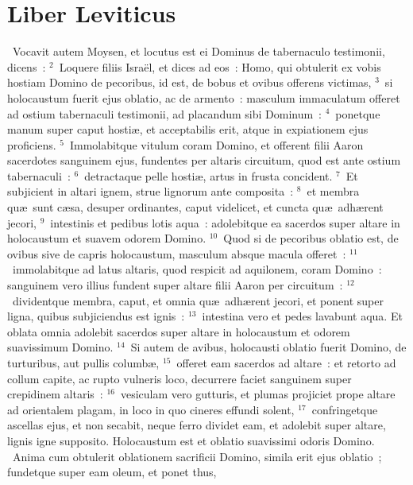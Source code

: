 \clearpage
{\centering \section*{Liber Leviticus}}\thispagestyle{empty}

~Vocavit autem Moysen, et locutus est ei Dominus de tabernaculo testimonii, dicens~:
${}^{2}$~Loquere filiis Isra\"el, et dices ad eos~: Homo, qui obtulerit ex vobis hostiam Domino de pecoribus, id est, de bobus et ovibus offerens victimas,
${}^{3}$~si holocaustum fuerit ejus oblatio, ac de armento~: masculum immaculatum offeret ad ostium tabernaculi testimonii, ad placandum sibi Dominum~:
${}^{4}$~ponetque manum super caput hosti\ae , et acceptabilis erit, atque in expiationem ejus proficiens.
${}^{5}$~Immolabitque vitulum coram Domino, et offerent filii Aaron sacerdotes sanguinem ejus, fundentes per altaris circuitum, quod est ante ostium tabernaculi~:
${}^{6}$~detractaque pelle hosti\ae , artus in frusta concident.
${}^{7}$~Et subjicient in altari ignem, strue lignorum ante composita~:
${}^{8}$~et membra qu\ae\ sunt c\ae sa, desuper ordinantes, caput videlicet, et cuncta qu\ae\ adh\ae rent jecori,
${}^{9}$~intestinis et pedibus lotis aqua~: adolebitque ea sacerdos super altare in holocaustum et suavem odorem Domino.
${}^{10}$~Quod si de pecoribus oblatio est, de ovibus sive de capris holocaustum, masculum absque macula offeret~:
${}^{11}$~immolabitque ad latus altaris, quod respicit ad aquilonem, coram Domino~: sanguinem vero illius fundent super altare filii Aaron per circuitum~:
${}^{12}$~dividentque membra, caput, et omnia qu\ae\ adh\ae rent jecori, et ponent super ligna, quibus subjiciendus est ignis~:
${}^{13}$~intestina vero et pedes lavabunt aqua. Et oblata omnia adolebit sacerdos super altare in holocaustum et odorem suavissimum Domino.
${}^{14}$~Si autem de avibus, holocausti oblatio fuerit Domino, de turturibus, aut pullis columb\ae ,
${}^{15}$~offeret eam sacerdos ad altare~: et retorto ad collum capite, ac rupto vulneris loco, decurrere faciet sanguinem super crepidinem altaris~:
${}^{16}$~vesiculam vero gutturis, et plumas projiciet prope altare ad orientalem plagam, in loco in quo cineres effundi solent,
${}^{17}$~confringetque ascellas ejus, et non secabit, neque ferro dividet eam, et adolebit super altare, lignis igne supposito. Holocaustum est et oblatio suavissimi odoris Domino.
~Anima cum obtulerit oblationem sacrificii Domino, simila erit ejus oblatio~; fundetque super eam oleum, et ponet thus,
